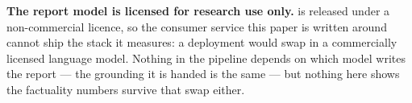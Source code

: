 \textbf{The report model is licensed for research use only.} \LLMName{} is
released under a non-commercial licence, so the consumer service this paper is
written around cannot ship the stack it measures: a deployment would swap in a
commercially licensed language model. Nothing in the pipeline depends on which
model writes the report --- the grounding it is handed is the same --- but
nothing here shows the factuality numbers survive that swap either.
